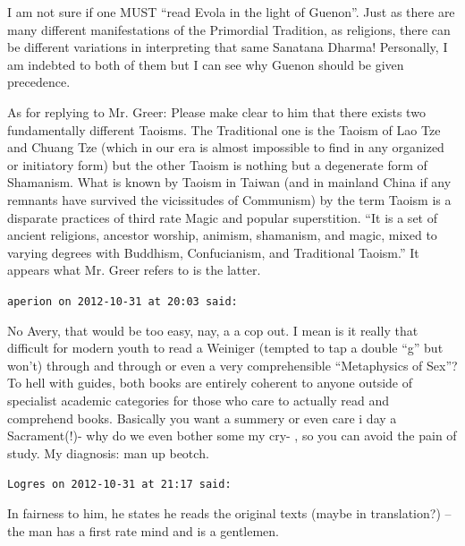 \begin{footnotesize}
\begin{sffamily}
I am not sure if one MUST ``read Evola in the light of Guenon''. Just as there are many different manifestations of the Primordial Tradition, as religions, there can be different variations in interpreting that same Sanatana Dharma! Personally, I am indebted to both of them but I can see why Guenon should be given precedence.

As for replying to Mr. Greer: Please make clear to him that there exists two fundamentally different Taoisms. The Traditional one is the Taoism of Lao Tze and Chuang Tze (which in our era is almost impossible to find in any organized or initiatory form) but the other Taoism is nothing but a degenerate form of Shamanism. What is known by Taoism in Taiwan (and in mainland China if any remnants have survived the vicissitudes of Communism) by the term Taoism is a disparate practices of third rate Magic and popular superstition. ``It is a set of ancient religions, ancestor worship, animism, shamanism, and magic, mixed to varying degrees with Buddhism, Confucianism, and Traditional Taoism.'' It appears what Mr. Greer refers to is the latter.

\hfill

\texttt{aperion on 2012-10-31 at 20:03 said:}

No Avery, that would be too easy, nay, a a cop out. I mean is it really that difficult for modern youth to read a Weiniger (tempted to tap a double ``g'' but won't) through and through or even a very comprehensible ``Metaphysics of Sex''? To hell with guides, both books are entirely coherent to anyone outside of specialist academic categories for those who care to actually read and comprehend books. Basically you want a summery or even care i day a Sacrament(!)- why do we even bother some my cry- , so you can avoid the pain of study. My diagnosis: man up beotch.

\hfill

\texttt{Logres on 2012-10-31 at 21:17 said:}

In fairness to him, he states he reads the original texts (maybe in translation?) -- the man has a first rate mind and is a gentlemen.


\hfill

\end{sffamily}
\end{footnotesize}

